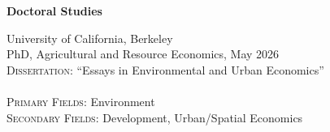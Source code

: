 \documentclass[10pt, oneside]{article}
\begin{document}
\begin{minipage}[t]{0.1\linewidth}
\textbf{Doctoral Studies}
\end{minipage}\hspace{0.05\linewidth}
\begin{minipage}[t]{0.8\linewidth}
University of California, Berkeley\\
PhD, Agricultural and Resource Economics, May 2026 \\
\textsc{Dissertation:}  ``Essays in Environmental and Urban Economics'' \\ 
~\\ 
\textsc{Primary Fields:} Environment \\
\textsc{Secondary Fields:} Development, Urban/Spatial Economics \\
\vspace{0.3cm} 
\end{minipage}
\end{document}
